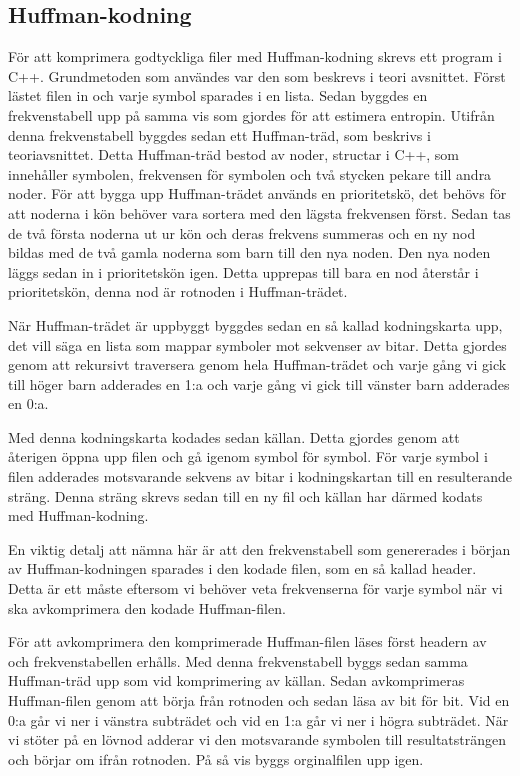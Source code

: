 \subsection{Huffman-kodning}
För att komprimera godtyckliga filer med Huffman-kodning skrevs ett program i C++. Grundmetoden som användes var den som beskrevs i teori avsnittet. Först lästet filen in och varje symbol sparades i en lista. Sedan byggdes en frekvenstabell upp på samma vis som gjordes för att estimera entropin. Utifrån denna frekvenstabell byggdes sedan ett Huffman-träd, som beskrivs i teoriavsnittet. Detta Huffman-träd bestod av noder, structar i C++, som innehåller symbolen, frekvensen för symbolen och två stycken pekare till andra noder. För att bygga upp Huffman-trädet används en prioritetskö, det behövs för att noderna i kön behöver vara sortera med den lägsta frekvensen först. Sedan tas de två första noderna ut ur kön och deras frekvens summeras och en ny nod bildas med de två gamla noderna som barn till den nya noden. Den nya noden läggs sedan in i prioritetskön igen. Detta upprepas till bara en nod återstår i prioritetskön, denna nod är rotnoden i Huffman-trädet.

När Huffman-trädet är uppbyggt byggdes sedan en så kallad kodningskarta upp, det vill säga en lista som mappar symboler mot sekvenser av bitar. Detta gjordes genom att rekursivt traversera genom hela Huffman-trädet och varje gång vi gick till höger barn adderades en 1:a och varje gång vi gick till vänster barn adderades en 0:a.

Med denna kodningskarta kodades sedan källan. Detta gjordes genom att återigen öppna upp filen och gå igenom symbol för symbol. För varje symbol i filen adderades motsvarande sekvens av bitar i kodningskartan till en resulterande sträng. Denna sträng skrevs sedan till en ny fil och källan har därmed kodats med Huffman-kodning.

En viktig detalj att nämna här är att den frekvenstabell som genererades i början av Huffman-kodningen sparades i den kodade filen, som en så kallad header. Detta är ett måste eftersom vi behöver veta frekvenserna för varje symbol när vi ska avkomprimera den kodade Huffman-filen.

För att avkomprimera den komprimerade Huffman-filen läses först headern av och frekvenstabellen erhålls. Med denna frekvenstabell byggs sedan samma Huffman-träd upp som vid komprimering av källan. Sedan avkomprimeras Huffman-filen genom att börja från rotnoden och sedan läsa av bit för bit. Vid en 0:a går vi ner i vänstra subträdet och vid en 1:a går vi ner i högra subträdet. När vi stöter på en lövnod adderar vi den motsvarande symbolen till resultatsträngen och börjar om ifrån rotnoden. På så vis byggs orginalfilen upp igen.
